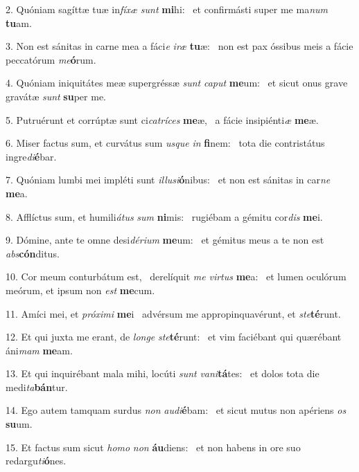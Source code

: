 2. Quóniam sagíttæ tuæ in\textit{fí}\textit{xæ} \textit{sunt} \textbf{mi}hi: \ast\  et confirmásti super me ma\textit{num} \textbf{tu}am.\

3. Non est sánitas in carne mea a fáci\textit{e} \textit{i}\textit{ræ} \textbf{tu}æ: \ast\  non est pax óssibus meis a fácie peccatórum \textit{me}\textbf{ó}rum.\

4. Quóniam iniquitátes meæ supergréssæ \textit{sunt} \textit{ca}\textit{put} \textbf{me}um: \ast\  et sicut onus grave gravátæ \textit{sunt} \textbf{su}per me.\

5. Putruérunt et corrúptæ sunt ci\textit{ca}\textit{trí}\textit{ces} \textbf{me}æ, \ast\  a fácie insipiénti\textit{æ} \textbf{me}æ.\

6. Miser factus sum, et curvátus sum \textit{us}\textit{que} \textit{in} \textbf{fi}nem: \ast\  tota die contristátus ingre\textit{di}\textbf{é}bar.\

7. Quóniam lumbi mei impléti sunt \textit{il}\textit{lu}\textit{si}\textbf{ó}nibus: \ast\  et non est sánitas in car\textit{ne} \textbf{me}a.\

8. Afflíctus sum, et humili\textit{á}\textit{tus} \textit{sum} \textbf{ni}mis: \ast\  rugiébam a gémitu cor\textit{dis} \textbf{me}i.\

9. Dómine, ante te omne desi\textit{dé}\textit{ri}\textit{um} \textbf{me}um: \ast\  et gémitus meus a te non est \textit{abs}\textbf{cón}ditus.\

10. Cor meum conturbátum est, \dag\  derelíquit \textit{me} \textit{vir}\textit{tus} \textbf{me}a: \ast\  et lumen oculórum meórum, et ipsum non \textit{est} \textbf{me}cum.\

11. Amíci mei, et \textit{pró}\textit{xi}\textit{mi} \textbf{me}i \ast\  advérsum me appropinquavérunt, et \textit{ste}\textbf{té}runt.\

12. Et qui juxta me erant, de \textit{lon}\textit{ge} \textit{ste}\textbf{té}runt: \ast\  et vim faciébant qui quærébant áni\textit{mam} \textbf{me}am.\

13. Et qui inquirébant mala mihi, locúti \textit{sunt} \textit{va}\textit{ni}\textbf{tá}tes: \ast\  et dolos tota die medi\textit{ta}\textbf{bán}tur.\

14. Ego autem tamquam surdus \textit{non} \textit{au}\textit{di}\textbf{é}bam: \ast\  et sicut mutus non apériens \textit{os} \textbf{su}um.\

15. Et factus sum sicut \textit{ho}\textit{mo} \textit{non} \textbf{áu}diens: \ast\  et non habens in ore suo redargu\textit{ti}\textbf{ó}nes.\

